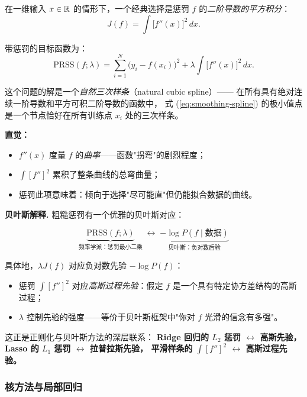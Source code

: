 \begin{example}
在一维输入 $x \in \mathbb{R}$ 的情形下，一个经典选择是惩罚 $f$ 的\emph{二阶导数的平方积分}：
\begin{equation}
    J(f) = \int \big[f''(x)\big]^2 \,dx.
\end{equation}

带惩罚的目标函数为：
\begin{equation}\label{eq:smoothing-spline}
    \mathrm{PRSS}(f; \lambda) = \sum_{i=1}^{N} \big(y_i - f(x_i)\big)^2
                              + \lambda \int \big[f''(x)\big]^2 \,dx.
\end{equation}

这个问题的解是一个\emph{自然三次样条}（natural cubic spline）——
在所有具有绝对连续一阶导数和平方可积二阶导数的函数中，
式 (\ref{eq:smoothing-spline}) 的极小值点是一个节点恰好在所有训练点 $x_i$ 处的三次样条。

\textbf{直觉：} 
\begin{itemize}
    \item $f''(x)$ 度量 $f$ 的\emph{曲率}——函数"拐弯"的剧烈程度；
    \item $\int [f'']^2$ 累积了整条曲线的总弯曲量；
    \item 惩罚此项意味着：倾向于选择"尽可能直"但仍能拟合数据的曲线。
\end{itemize}
\end{example}

\medskip
\textbf{贝叶斯解释.} 粗糙惩罚有一个优雅的贝叶斯对应：

\[
\underbrace{\mathrm{PRSS}(f; \lambda)}_{\text{频率学派：惩罚最小二乘}}
\;\longleftrightarrow\;
\underbrace{-\log P(f \mid \text{数据})}_{\text{贝叶斯：负对数后验}}
\]

具体地，$\lambda J(f)$ 对应负对数先验 $-\log P(f)$：
\begin{itemize}
    \item 惩罚 $\int [f'']^2$ 对应\emph{高斯过程先验}：假定 $f$ 是一个具有特定协方差结构的高斯过程；
    \item $\lambda$ 控制先验的强度——等价于贝叶斯框架中"你对 $f$ 光滑的信念有多强"。
\end{itemize}

这正是正则化与贝叶斯方法的深层联系：
\textbf{Ridge 回归的 $L_2$ 惩罚 $\leftrightarrow$ 高斯先验，
Lasso 的 $L_1$ 惩罚 $\leftrightarrow$ 拉普拉斯先验，
平滑样条的 $\int [f'']^2$ $\leftrightarrow$ 高斯过程先验。}

\subsubsection{核方法与局部回归}

